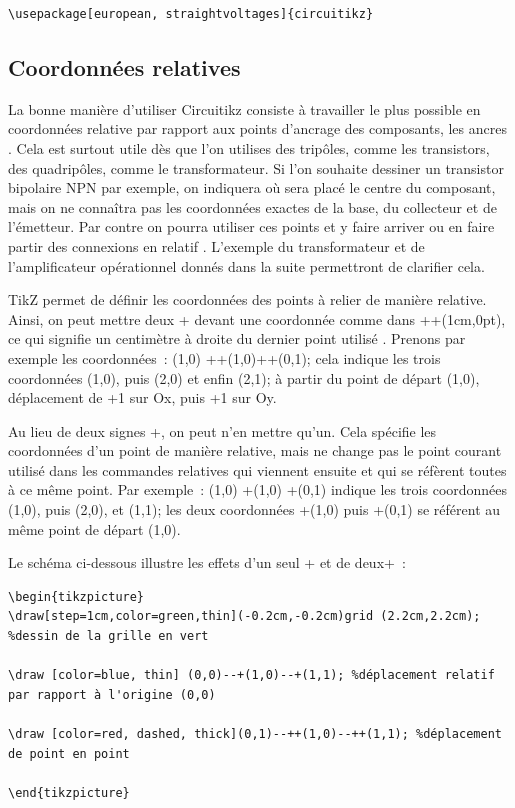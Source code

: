 \documentclass[10pt]{article}
\begin{document}
\begin{verbatim}
\usepackage[european, straightvoltages]{circuitikz}
\end{verbatim}



\subsection{Coordonnées relatives}

La \og bonne \fg{} manière d'utiliser Circuitikz consiste à travailler le plus possible en coordonnées relative par rapport aux points d'ancrage des composants, les \og ancres \fg. Cela est surtout utile dès que l'on utilises des tripôles, comme les transistors, des quadripôles, comme le transformateur. Si l'on souhaite dessiner un transistor bipolaire NPN par exemple, on indiquera où sera placé le centre du composant, mais on ne connaîtra pas les coordonnées exactes de la base, du collecteur et de l'émetteur. Par contre on pourra utiliser ces points et y faire arriver ou en faire partir des connexions \og en relatif \fg. L'exemple du transformateur et de l'amplificateur opérationnel donnés dans la suite permettront de clarifier cela.

\vspace{0.5cm}


TikZ permet de définir les coordonnées des points à relier de manière relative. Ainsi, on peut mettre deux + devant une coordonnée comme dans ++(1cm,0pt), ce qui signifie \og un centimètre à droite du dernier point utilisé \fg. Prenons par exemple les coordonnées~: (1,0) ++(1,0)++(0,1); cela indique les trois coordonnées (1,0), puis (2,0) et enfin (2,1); à partir du point de départ (1,0), déplacement de +1 sur Ox, puis +1 sur Oy.

Au lieu de deux signes +, on peut n'en mettre qu'un. Cela spécifie les coordonnées d'un point de manière relative, mais ne \og change \fg{} pas le point courant utilisé dans les commandes relatives qui viennent ensuite et qui se réfèrent toutes à ce même point. Par exemple~: (1,0) +(1,0) +(0,1) indique les trois coordonnées (1,0), puis (2,0), et (1,1); les deux coordonnées +(1,0) puis +(0,1) se référent au même point de départ (1,0).

Le schéma ci-dessous illustre les effets d'un seul + et de deux+~:

\begin{verbatim}
\begin{tikzpicture}
\draw[step=1cm,color=green,thin](-0.2cm,-0.2cm)grid (2.2cm,2.2cm); %dessin de la grille en vert

\draw [color=blue, thin] (0,0)--+(1,0)--+(1,1); %déplacement relatif par rapport à l'origine (0,0)  

\draw [color=red, dashed, thick](0,1)--++(1,0)--++(1,1); %déplacement de point en point

\end{tikzpicture}
\end{verbatim}
\end{document}
